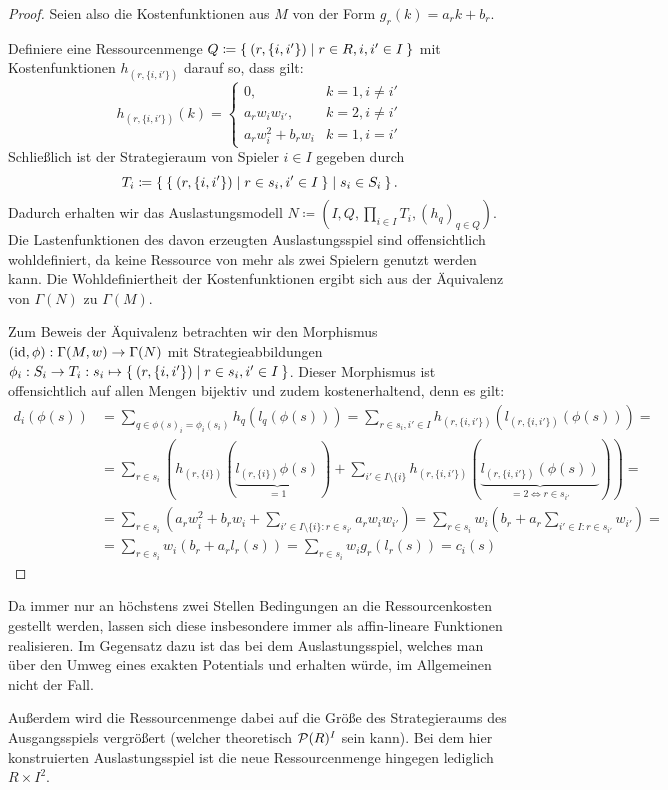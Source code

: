 \begin{proof}
	Seien also die Kostenfunktionen aus $M$ von der Form $g_r(k) = a_r k + b_r$.
	
	Definiere eine Ressourcenmenge $Q \coloneqq \Set{(r, \{i, i'\}) | r \in R, i,i' \in I}$ mit Kostenfunktionen $h_{(r, \{i,i'\})}$ darauf so, dass gilt:
		\[h_{(r, \{i,i'\})} (k) = \begin{cases}
									0, 					& k=1, i \neq i' \\
									a_r w_i w_{i'}, 	& k=2, i \neq i' \\
									a_r w_i^2 + b_r w_i	& k=1, i = i'
								\end{cases} \]
	Schließlich ist der Strategieraum von Spieler $i \in I$ gegeben durch
		\[T_i \coloneqq \Set{\Set{(r, \{i, i'\}) | r \in s_i, i' \in I} | s_i \in S_i }.\]
	Dadurch erhalten wir das Auslastungsmodell $N \coloneqq (I, Q, \prod_{i \in I} T_i, (h_q)_{q \in Q})$. Die Lastenfunktionen des davon erzeugten Auslastungsspiel sind offensichtlich wohldefiniert, da keine Ressource von mehr als zwei Spielern genutzt werden kann. Die Wohldefiniertheit der Kostenfunktionen ergibt sich aus der Äquivalenz von $\Gamma(N)$ zu $\Gamma(M)$.
	
	Zum Beweis der Äquivalenz betrachten wir den Morphismus $(\mathrm{id}, \phi): \Gamma(M,w) \to \Gamma(N)$ mit Strategieabbildungen $\phi_i: S_i \to T_i: s_i \mapsto \Set{(r, \{i, i'\}) | r \in s_i, i' \in I}$. Dieser Morphismus ist offensichtlich auf allen Mengen bijektiv und zudem kostenerhaltend, denn es gilt:
	\begin{align*}
	d_i(\phi(s)) 	&= \sum_{q \in \phi(s)_i = \phi_i(s_i)} h_q(l_q(\phi(s))) = \sum_{r \in s_i, i' \in I} h_{(r, \{i,i'\})}(l_{(r, \{i,i'\})}(\phi(s))) = \\
	&= \sum_{r \in s_i} \left(h_{(r, \{i\})}(\underbrace{l_{(r, \{i\})}\phi(s)}_{=1}) + \sum_{i' \in I\setminus\{i\}} h_{(r, \{i, i'\})}(\underbrace{l_{(r, \{i, i'\})}(\phi(s))}_{=2 \iff r \in s_{i'}})\right) = \\
	&= \sum_{r \in s_i}\left( a_r w_i^2 + b_r w_i + \sum_{i' \in I\setminus\{i\}: r \in s_{i'}} a_r w_i w_{i'}\right) = \sum_{r \in s_i}w_i \left( b_r + a_r \sum_{i' \in I: r \in s_{i'}}w_{i'} \right) =\\
	&= \sum_{r \in s_i}w_i \left( b_r + a_r l_r(s)\right) = \sum_{r \in s_i}w_i g_r(l_r(s)) = c_i(s)
	\end{align*}
\end{proof}

\begin{beob}
	Da immer nur an höchstens zwei Stellen Bedingungen an die Ressourcenkosten gestellt werden, lassen sich diese insbesondere immer als affin-lineare Funktionen realisieren. Im Gegensatz dazu ist das bei dem Auslastungsspiel, welches man über den Umweg eines exakten Potentials und  erhalten würde, im Allgemeinen nicht der Fall. 
	
	Außerdem wird die Ressourcenmenge dabei auf die Größe des Strategieraums des Ausgangsspiels vergrößert (welcher theoretisch $\mathcal{P}(R)^I$ sein kann). Bei dem hier konstruierten Auslastungsspiel ist die neue Ressourcenmenge hingegen lediglich $R \times I^2$.
\end{beob}

